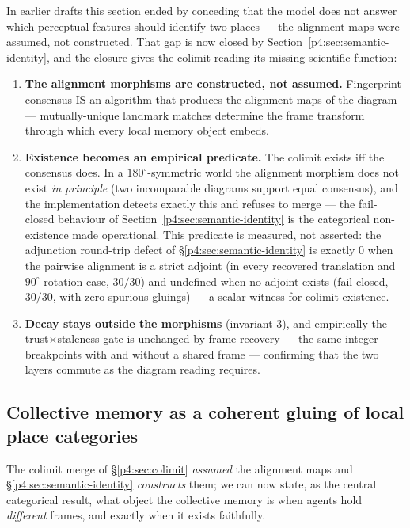 \documentclass{article}
\begin{document}
In earlier drafts this section ended by conceding that the model does
not answer which perceptual features should identify two places ---
the alignment maps were assumed, not constructed. That gap is now
closed by Section~\ref{p4:sec:semantic-identity}, and the closure gives
the colimit reading its missing scientific function:
\begin{enumerate}[leftmargin=20pt,itemsep=2pt,topsep=2pt]
\item \textbf{The alignment morphisms are constructed, not assumed.}
  Fingerprint consensus IS an algorithm that produces the alignment
  maps of the diagram --- mutually-unique landmark matches determine
  the frame transform through which every local memory object embeds.
\item \textbf{Existence becomes an empirical predicate.} The colimit
  exists iff the consensus does. In a $180^\circ$-symmetric world the
  alignment morphism does not exist \emph{in principle} (two
  incomparable diagrams support equal consensus), and the
  implementation detects exactly this and refuses to merge --- the
  fail-closed behaviour of Section~\ref{p4:sec:semantic-identity} is the
  categorical non-existence made operational. This predicate is
  measured, not asserted: the adjunction round-trip defect of
  \S\ref{p4:sec:semantic-identity} is exactly $0$ when the pairwise
  alignment is a strict adjoint (in every recovered translation and
  $90^\circ$-rotation case, $30/30$) and undefined when no adjoint
  exists (fail-closed, $30/30$, with zero spurious gluings) --- a scalar
  witness for colimit existence.
\item \textbf{Decay stays outside the morphisms} (invariant 3), and
  empirically the trust$\times$staleness gate is unchanged by frame
  recovery --- the same integer breakpoints with and without a shared
  frame --- confirming that the two layers commute as the diagram
  reading requires.
\end{enumerate}

\subsection{Collective memory as a coherent gluing of local place categories}
\label{p4:sec:gluing}

The colimit merge of \S\ref{p4:sec:colimit} \emph{assumed} the alignment maps and
\S\ref{p4:sec:semantic-identity} \emph{constructs} them; we can now state, as the
central categorical result, what object the collective memory is when agents
hold \emph{different} frames, and exactly when it exists faithfully.
\end{document}
